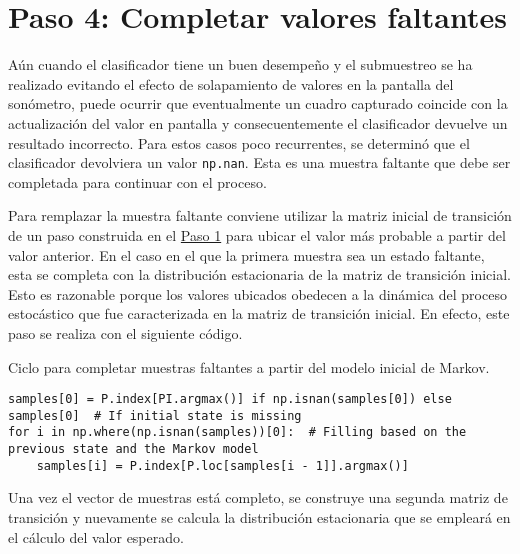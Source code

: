 \section*{Paso 4: Completar valores faltantes}
\label{sec:fill_missing_values}
Aún cuando el clasificador tiene un buen desempeño y el submuestreo se ha realizado evitando el efecto de solapamiento de valores en la pantalla del sonómetro, puede ocurrir que eventualmente un cuadro capturado coincide con la actualización del valor en pantalla y consecuentemente el clasificador devuelve un resultado incorrecto.
Para estos casos poco recurrentes, se determinó que el clasificador devolviera un valor \texttt{\small np.nan}.
Esta es una muestra faltante que debe ser completada para continuar con el proceso.

Para remplazar la muestra faltante conviene utilizar la matriz inicial de transición de un paso construida en el \hyperref[sec:downsampling]{Paso 1} para ubicar el valor más probable a partir del valor anterior.
En el caso en el que la primera muestra sea un estado faltante, esta se completa con la distribución estacionaria de la matriz de transición inicial.
Esto es razonable porque los valores ubicados obedecen a la dinámica del proceso estocástico que fue caracterizada en la matriz de transición inicial.
En efecto, este paso se realiza con el siguiente código.
%
\begin{code}
    \caption{Ciclo para completar muestras faltantes a partir del modelo inicial de Markov.}
    \label{code:filling_missing_samples}
    \centering
    \begin{verbatim}
samples[0] = P.index[PI.argmax()] if np.isnan(samples[0]) else samples[0]  # If initial state is missing
for i in np.where(np.isnan(samples))[0]:  # Filling based on the previous state and the Markov model
    samples[i] = P.index[P.loc[samples[i - 1]].argmax()]
    \end{verbatim}
\end{code}

Una vez el vector de muestras está completo, se construye una segunda matriz de transición y nuevamente se calcula la distribución estacionaria que se empleará en el cálculo del valor esperado.

